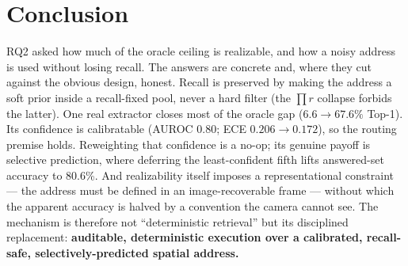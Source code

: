 \section{Conclusion}

RQ2 asked how much of the oracle ceiling is realizable, and how a noisy address is used without losing
recall. The answers are concrete and, where they cut against the obvious design, honest. Recall is
preserved by making the address a soft prior inside a recall-fixed pool, never a hard filter (the
$\prod r$ collapse forbids the latter). One real extractor closes most of the oracle gap ($6.6 \to
67.6\%$ Top-1). Its confidence is calibratable (AUROC 0.80; ECE $0.206 \to 0.172$), so the routing
premise holds. Reweighting that confidence is a no-op; its genuine payoff is selective prediction,
where deferring the least-confident fifth lifts answered-set accuracy to 80.6\%. And realizability
itself imposes a representational constraint --- the address must be defined in an image-recoverable
frame --- without which the apparent accuracy is halved by a convention the camera cannot see. The
mechanism is therefore not ``deterministic retrieval'' but its disciplined replacement:
\textbf{auditable, deterministic execution over a calibrated, recall-safe, selectively-predicted
spatial address.}
